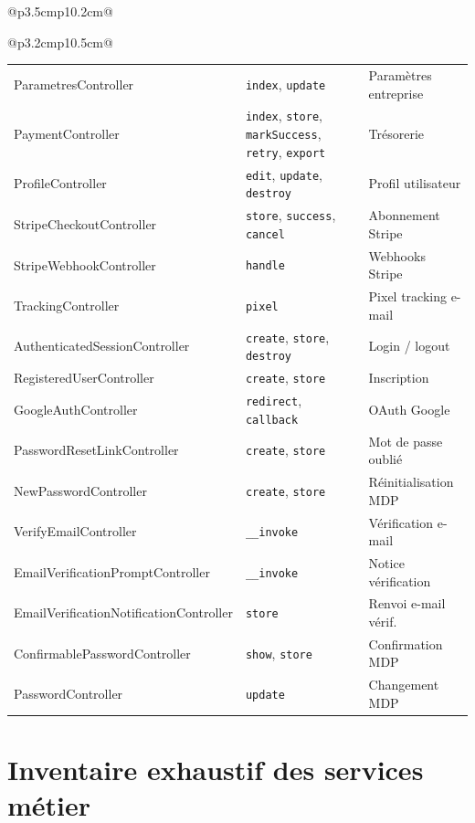 \documentclass[11pt,a4paper]{report}
\begin{document}
\begin{longtable}{@{}p{3.5cm}p{10.2cm}@{}}
\begin{longtable}{@{}p{3.2cm}p{10.5cm}@{}}
\begin{longtable}{@{}p{3.8cm}p{5.5cm}p{5.2cm}@{}}
ParametresController & \texttt{index}, \texttt{update} & Paramètres entreprise \\
PaymentController & \texttt{index}, \texttt{store}, \texttt{markSuccess}, \texttt{retry}, \texttt{export} & Trésorerie \\
ProfileController & \texttt{edit}, \texttt{update}, \texttt{destroy} & Profil utilisateur \\
StripeCheckoutController & \texttt{store}, \texttt{success}, \texttt{cancel} & Abonnement Stripe \\
StripeWebhookController & \texttt{handle} & Webhooks Stripe \\
TrackingController & \texttt{pixel} & Pixel tracking e-mail \\
AuthenticatedSessionController & \texttt{create}, \texttt{store}, \texttt{destroy} & Login / logout \\
RegisteredUserController & \texttt{create}, \texttt{store} & Inscription \\
GoogleAuthController & \texttt{redirect}, \texttt{callback} & OAuth Google \\
PasswordResetLinkController & \texttt{create}, \texttt{store} & Mot de passe oublié \\
NewPasswordController & \texttt{create}, \texttt{store} & Réinitialisation MDP \\
VerifyEmailController & \texttt{\_\_invoke} & Vérification e-mail \\
EmailVerificationPromptController & \texttt{\_\_invoke} & Notice vérification \\
EmailVerificationNotificationController & \texttt{store} & Renvoi e-mail vérif. \\
ConfirmablePasswordController & \texttt{show}, \texttt{store} & Confirmation MDP \\
PasswordController & \texttt{update} & Changement MDP \\
\bottomrule
\end{longtable}
\endgroup

\chapter{Inventaire exhaustif des services métier}
\label{annexe:services}


\end{longtable}
\end{longtable}
\end{document}
